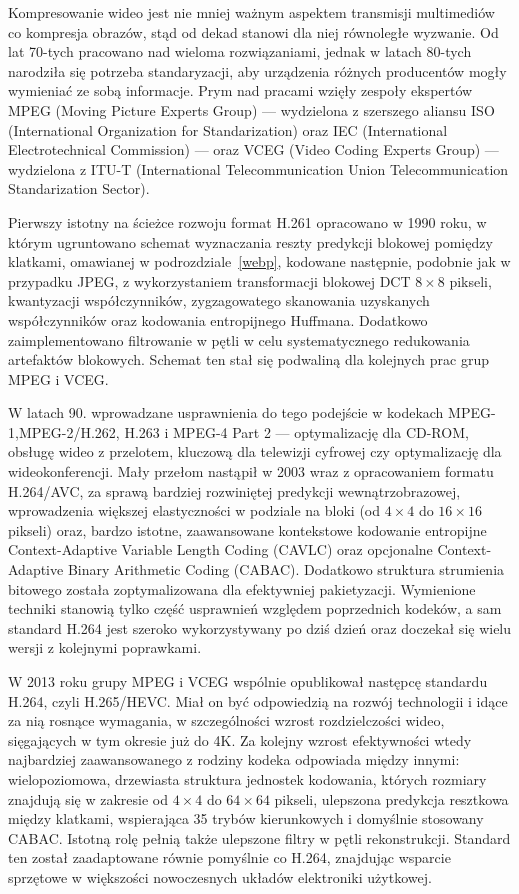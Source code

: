 Kompresowanie wideo jest nie mniej ważnym aspektem transmisji multimediów co kompresja obrazów, stąd od dekad stanowi dla niej równoległe wyzwanie. Od lat 70-tych pracowano nad wieloma rozwiązaniami, jednak w latach 80-tych narodziła się potrzeba standaryzacji, aby urządzenia różnych producentów mogły wymieniać ze sobą informacje. Prym nad pracami wzięły zespoły ekspertów MPEG (Moving Picture Experts Group) --- wydzielona z szerszego aliansu ISO (International Organization for Standarization) oraz IEC (International Electrotechnical Commission) --- oraz VCEG (Video Coding Experts Group) --- wydzielona z ITU-T (International Telecommunication Union Telecommunication Standarization Sector).

Pierwszy istotny na ścieżce rozwoju format H.261 opracowano w 1990 roku, w którym ugruntowano schemat wyznaczania reszty predykcji blokowej pomiędzy klatkami, omawianej w podrozdziale~\ref{webp}, kodowane następnie, podobnie jak w przypadku JPEG, z wykorzystaniem transformacji blokowej DCT \(8 \times 8\) pikseli, kwantyzacji współczynników, zygzagowatego skanowania uzyskanych współczynników oraz kodowania entropijnego Huffmana. Dodatkowo zaimplementowano filtrowanie w pętli w celu systematycznego redukowania artefaktów blokowych. Schemat ten stał się podwaliną dla kolejnych prac grup MPEG i VCEG\cite{doi:https://doi.org/10.1002/9781118711743.ch3}.

W latach 90. wprowadzane usprawnienia do tego podejście w kodekach MPEG-1,\allowbreak MPEG-2/H.262, H.263 i MPEG-4 Part 2 --- optymalizację dla CD-ROM, obsługę wideo z przelotem, kluczową dla telewizji cyfrowej czy optymalizację dla wideokonferencji. Mały przełom nastąpił w 2003 wraz z opracowaniem formatu H.264/AVC, za sprawą bardziej rozwiniętej predykcji wewnątrzobrazowej, wprowadzenia większej elastyczności w podziale na bloki (od \(4 \times 4 \) do \(16 \times 16\) pikseli) oraz, bardzo istotne, zaawansowane kontekstowe kodowanie entropijne Context-Adaptive Variable Length Coding (CAVLC) oraz opcjonalne Context-Adaptive Binary Arithmetic Coding (CABAC). Dodatkowo struktura strumienia bitowego została zoptymalizowana dla efektywniej pakietyzacji. Wymienione techniki stanowią tylko część usprawnień względem poprzednich kodeków, a sam standard H.264 jest szeroko wykorzystywany po dziś dzień oraz doczekał się wielu wersji z kolejnymi poprawkami.

W 2013 roku grupy MPEG i VCEG wspólnie opublikował następcę standardu H.264, czyli H.265/HEVC. Miał on być odpowiedzią na rozwój technologii i idące za nią rosnące wymagania, w szczególności wzrost rozdzielczości wideo, sięgających w tym okresie już do 4K. Za kolejny wzrost efektywności wtedy najbardziej zaawansowanego z rodziny kodeka odpowiada między innymi: wielopoziomowa, drzewiasta struktura jednostek kodowania, których rozmiary znajdują się w zakresie od \(4 \times 4\) do \(64 \times 64\) pikseli, ulepszona predykcja resztkowa między klatkami, wspierająca 35 trybów kierunkowych i domyślnie stosowany CABAC. Istotną rolę pełnią także ulepszone filtry w pętli rekonstrukcji. Standard ten został zaadaptowane równie pomyślnie co H.264, znajdując wsparcie sprzętowe w większości nowoczesnych układów elektroniki użytkowej.

